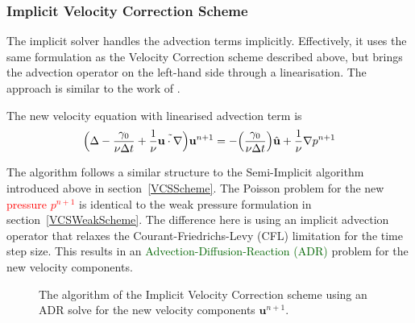 \subsubsection{Implicit Velocity Correction Scheme}
\label{VCSImplicitScheme}

The implicit solver handles the advection terms implicitly. 
Effectively, it uses the same formulation
as the Velocity Correction scheme described above, but brings the advection
operator on the left-hand side through a linearisation. 
The approach is similar to the work of \cite{Simo1994,Dong2010}.

The new velocity equation with linearised advection term is
\begin{equation}
    \Bigl(\Delta-\frac{\gamma_0}{\nu \Delta t} + \frac{1}{\nu} \tilde{\mathbf{u} \cdot \nabla}\Bigr)\mathbf{u}^{n+1}=-\Bigl(\frac{\gamma_0}{\nu \Delta t}\Bigr)\hat{\mathbf{u}} + \frac{1}{\nu} \nabla p^{n+1}
  \label{eqn.velocityadr}
\end{equation}

The algorithm follows a similar structure to the Semi-Implicit 
algorithm introduced above in section~\ref{VCSScheme}.
The Poisson problem for the new \textcolor{red}{pressure $p^{n+1}$} is 
identical to the weak pressure formulation in section~\ref{VCSWeakScheme}.
The difference here is using an implicit advection operator that relaxes 
the Courant-Friedrichs-Levy (CFL) limitation for the time step size.
This results in an \textcolor{darkgreen}{Advection-Diffusion-Reaction (ADR)} problem for the new velocity components.

\begin{figure}[!htbp]
\centering
{}
\label{fig.VCSImplicitAlgorithm}
\caption{The algorithm of the Implicit Velocity Correction scheme using an 
ADR solve for the new velocity components $\mathbf{u}^{n+1}$.}
\end{figure}

